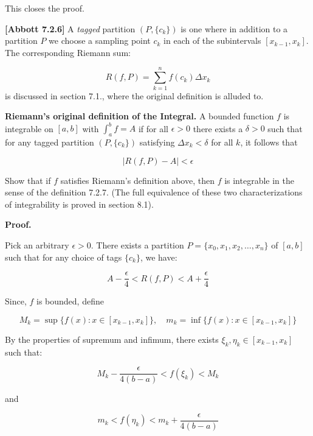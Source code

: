\documentclass[10pt]{article}
\begin{document}
This closes the proof.



\textbf{[Abbott 7.2.6]} A \textit{tagged} partition $\displaystyle ( P,\{c_{k}\})$ is one where in addition to a partition $\displaystyle P$ we choose a sampling point $\displaystyle c_{k}$ in each of the subintervals $\displaystyle [ x_{k-1} ,x_{k}]$. The corresponding Riemann sum:


\begin{equation*}
R( f,P) =\sum _{k=1}^{n} f( c_{k}) \Delta x_{k}
\end{equation*}
is discussed in section 7.1., where the original definition is alluded to. 



\textbf{Riemann's original definition of the Integral.} A bounded function $\displaystyle f$ is integrable on $\displaystyle [ a,b]$ with $\displaystyle \int _{a}^{b} f=A$ if for all $\displaystyle \epsilon  >0$ there exists a $\displaystyle \delta  >0$ such that for any tagged partition $\displaystyle ( P,\{c_{k}\})$ satisfying $\displaystyle \Delta x_{k} < \delta $ for all $\displaystyle k$, it follows that 


\begin{equation*}
|R( f,P) -A|< \epsilon 
\end{equation*}


Show that if $\displaystyle f$ satisfies Riemann's definition above, then $\displaystyle f$ is integrable in the sense of the definition 7.2.7. (The full equivalence of these two characterizations of integrability is proved in section 8.1). 



\textbf{Proof.}


Pick an arbitrary $\epsilon > 0$. There exists a partition $P = \{x_0,x_1,x_2,\ldots,x_n\}$ of $[a,b]$ such that for any choice of tags $\{c_k\}$, we have:

$$A - \frac{\epsilon}{4} < R(f,P) < A + \frac{\epsilon}{4}$$


Since, $f$ is bounded, define 

$$M_k = \sup \{f(x) : x \in [x_{k-1},x_k]\}, \quad m_k = \inf \{f(x) : x \in [x_{k-1},x_k]\}$$

By the properties of supremum and infimum, there exists $\xi_k, \eta_k \in [x_{k-1},x_k]$ such that:

$$M_k - \frac{\epsilon}{4(b-a)} < f(\xi_k) < M_k$$

and

$$m_k < f(\eta_k) < m_k + \frac{\epsilon}{4(b-a)}$$
\end{document}
